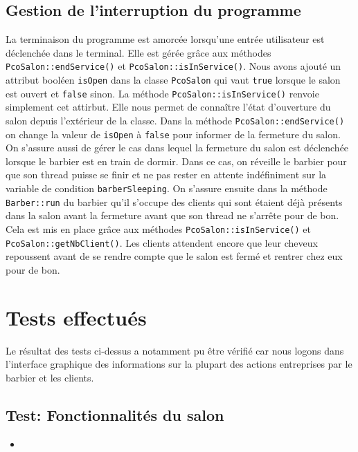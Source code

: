 \documentclass{article}
\begin{document}
\subsection*{Gestion de l'interruption du programme}

La terminaison du programme est amorcée lorsqu'une entrée utilisateur est déclenchée dans le terminal. Elle est gérée grâce aux méthodes 
\texttt{PcoSalon::endService()} et \texttt{PcoSalon::isInService()}. Nous avons ajouté un attribut booléen \texttt{isOpen} dans la classe \texttt{PcoSalon} 
qui vaut \texttt{true} lorsque le salon est ouvert et \texttt{false} sinon. La méthode \texttt{PcoSalon::isInService()} renvoie simplement cet attirbut. Elle nous
permet de connaître l'état d'ouverture du salon depuis l'extérieur de la classe. Dans la méthode \texttt{PcoSalon::endService()} on change la valeur de 
\texttt{isOpen} à \texttt{false} pour informer de la fermeture du salon. On s'assure aussi de gérer le cas dans lequel la fermeture du salon est 
déclenchée lorsque le barbier est en train de dormir. Dans ce cas, on réveille le barbier pour que son thread puisse se finir et ne pas rester en 
attente indéfiniment sur la variable de condition \texttt{barberSleeping}. 
On s'assure ensuite dans la méthode \texttt{Barber::run} du barbier qu'il s'occupe des clients qui sont étaient déjà présents dans la salon avant la
fermeture avant que son thread ne s'arrête pour de bon. Cela est mis en place grâce aux méthodes \texttt{PcoSalon::isInService()} et
\texttt{PcoSalon::getNbClient()}. Les clients attendent encore que leur cheveux repoussent avant de se rendre compte que le salon est fermé et rentrer 
chez eux pour de bon.

\section*{Tests effectués}

Le résultat des tests ci-dessus a notamment pu être vérifié car nous logons dans l'interface graphique des informations sur la plupart des 
actions entreprises par le barbier et les clients. 

\subsection*{Test: Fonctionnalités du salon}

\begin{itemize}
    \item 
\end{itemize}
\end{document}
